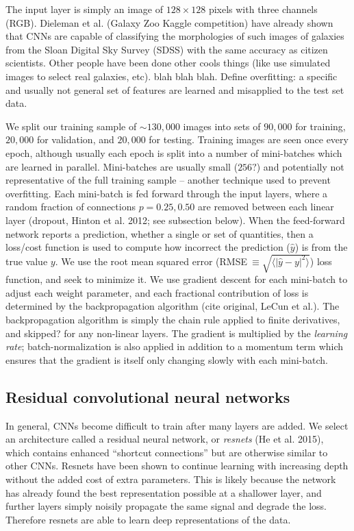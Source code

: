 \documentclass[fleqn,usenatbib]{mnras}
\begin{document}
The input layer is simply an image of $128\times 128$ pixels with three channels (RGB).
Dieleman et al. (Galaxy Zoo Kaggle competition) have already shown that CNNs are capable of classifying the morphologies of such images of galaxies from the Sloan Digital Sky Survey (SDSS) with the same accuracy as citizen scientists.
Other people have been done other cools things (like use simulated images to select real galaxies, etc).
blah blah blah.
Define overfitting: a specific and usually not general set of features are learned and misapplied to the test set data.

We split our training sample of $\sim 130,000$ images into sets of $90,000$ for training, $20,000$ for validation, and $20,000$ for testing.
Training images are seen once every epoch, although usually each epoch is split into a number of mini-batches which are learned in parallel.
Mini-batches are usually small ($256?$) and potentially not representative of the full training sample -- another technique used to prevent overfitting.
Each mini-batch is fed forward through the input layers, where a random fraction of connections $p=0.25, 0.50$ are removed between each linear layer (dropout, Hinton et al. 2012; see subsection below).
When the feed-forward network reports a prediction, whether a single or set of quantities, then a loss/cost function is used to compute how incorrect the prediction ($\hat y$) is from the true value $y$.
We use the root mean squared error (RMSE$~\equiv \sqrt{\langle |\hat y - y|^2\rangle}$) loss function, and seek to minimize it.
We use gradient descent for each mini-batch to adjust each weight parameter, and each fractional contribution of loss is determined by the backpropagation algorithm (cite original, LeCun et al.). 
The backpropagation algorithm is simply the chain rule applied to finite derivatives, and skipped? for any non-linear layers.
The gradient is multiplied by the \textit{learning rate}; batch-normalization is also applied in addition to a momentum term which ensures that the gradient is itself only changing slowly with each mini-batch.


\subsection{Residual convolutional neural networks}
In general, CNNs become difficult to train after many layers are added.
We select an architecture called a residual neural network, or \textit{resnets} (He et al. 2015), which contains enhanced ``shortcut connections'' but are otherwise similar to other CNNs.
Resnets have been shown to continue learning with increasing depth without the added cost of extra parameters.
This is likely because the network has already found the best representation possible at a shallower layer, and further layers simply noisily propagate the same signal and degrade the loss.
Therefore resnets are able to learn deep representations of the data.
\end{document}
